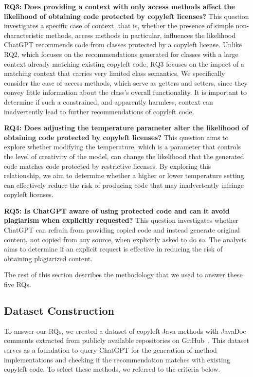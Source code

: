     \noindent  \textbf{RQ3:  Does providing a context with only access methods affect the likelihood of obtaining code protected by copyleft licenses?} This question investigates a specific case of context, that is, whether the presence of simple non-characteristic methods, access methods in particular, influences the likelihood  ChatGPT recommends code from classes protected by a copyleft license. Unlike RQ2, which focuses on the recommendations generated for classes with a large context already matching existing copyleft code, RQ3 focuses on the impact of a matching context that carries very limited class semantics. We specifically consider the case of access methods, which serve as getters and setters, since they convey little information about the class's overall functionality. It is important to determine if such a constrained, and apparently harmless, context can inadvertently lead to further recommendations of copyleft code.

    \noindent  \textbf{RQ4: Does adjusting the temperature parameter alter the likelihood of obtaining code protected by copyleft licenses?} This question aims to explore whether modifying the temperature, which is a parameter that controls the level of creativity of the model, can change the likelihood that the generated code matches code protected by restrictive licenses.  By exploring this relationship, we aim to determine whether a higher or lower temperature setting can effectively reduce the risk of producing code that may inadvertently infringe copyleft licenses. 

    \noindent  \textbf{RQ5: Is ChatGPT aware of using protected code and can it avoid plagiarism when explicitly requested?} 
    This question investigates whether ChatGPT can refrain from providing copied code and instead generate original content, not copied from any source, when explicitly asked to do so. The analysis aims to determine if an explicit request is effective in reducing the risk of obtaining plagiarized content.


The rest of this section describes the methodology that we used to answer these five RQs. 

\subsection{Dataset Construction}
To answer our RQs, we created a dataset of copyleft Java methods with JavaDoc comments extracted from publicly available repositories on GitHub~\cite{GitHub2024}. This dataset serves as a foundation to query ChatGPT for the generation of method implementations and checking if the recommendation matches with existing copyleft code. To select these methods, we referred to the criteria below.

